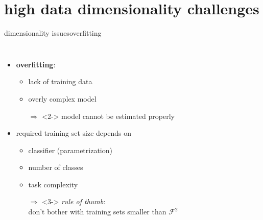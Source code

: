     \section[challenges]{high data dimensionality challenges}
		\begin{frame}{dimensionality issues}{overfitting}
            \vspace{-5mm}
            \begin{columns}
            \begin{itemize}
                \item   \textbf{overfitting}:
                    \begin{itemize}
                        \item   lack of training data
                        \item   overly complex model
                        \item[$\Rightarrow$]<2-> model cannot be estimated properly
                    \end{itemize}
                    
                    \bigskip
                    \item<2-> required training set size depends on 
                        \begin{itemize}
                            \item   classifier (parametrization)
                            \item   number of classes
                            \item   task complexity
                            \bigskip
                            \item[$\Rightarrow$]<3-> \textit{rule of thumb}:\\ don't bother with training sets smaller than $\mathcal{F}^2$
                        \end{itemize}
                    
			\end{itemize}
            \end{columns}
		\end{frame}
